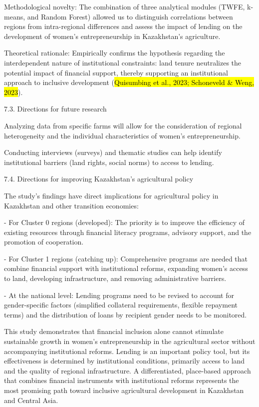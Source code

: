 \documentclass[
]{article}
\begin{document}
Methodological novelty: The combination of three analytical modules
(TWFE, k-means, and Random Forest) allowed us to distinguish
correlations between regions from intra-regional differences and assess
the impact of lending on the development of women's entrepreneurship in
Kazakhstan's agriculture.

Theoretical rationale: Empirically confirms the hypothesis regarding the
interdependent nature of institutional constraints: land tenure
neutralizes the potential impact of financial support, thereby
supporting an institutional approach to inclusive development
(\hl{Quisumbing et al., 2023; Schoneveld \& Weng, 2023}).

7.3. Directions for future research

Analyzing data from specific farms will allow for the consideration of
regional heterogeneity and the individual characteristics of women's
entrepreneurship.

Conducting interviews (surveys) and thematic studies can help identify
institutional barriers (land rights, social norms) to access to lending.

7.4. Directions for improving Kazakhstan's agricultural policy

The study's findings have direct implications for agricultural policy in
Kazakhstan and other transition economies:

- For Cluster 0 regions (developed): The priority is to improve the
efficiency of existing resources through financial literacy programs,
advisory support, and the promotion of cooperation.

- For Cluster 1 regions (catching up): Comprehensive programs are needed
that combine financial support with institutional reforms, expanding
women's access to land, developing infrastructure, and removing
administrative barriers.

- At the national level: Lending programs need to be revised to account
for gender-specific factors (simplified collateral requirements,
flexible repayment terms) and the distribution of loans by recipient
gender needs to be monitored.

This study demonstrates that financial inclusion alone cannot stimulate
sustainable growth in women's entrepreneurship in the agricultural
sector without accompanying institutional reforms. Lending is an
important policy tool, but its effectiveness is determined by
institutional conditions, primarily access to land and the quality of
regional infrastructure. A differentiated, place-based approach that
combines financial instruments with institutional reforms represents the
most promising path toward inclusive agricultural development in
Kazakhstan and Central Asia.
\end{document}

